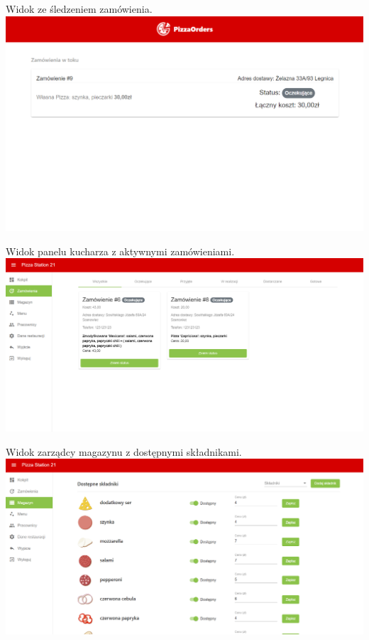 \documentclass[12pt]{article}
\begin{document}
\vspace{1cm}

Widok ze śledzeniem zamówienia. \\

\includegraphics[width=16cm]{order}

\clearpage

Widok panelu kucharza z aktywnymi zamówieniami. \\

\includegraphics[width=16cm]{orders}

Widok zarządcy magazynu z dostępnymi składnikami. \\

\includegraphics[width=16cm]{ingredients}
\end{document}

